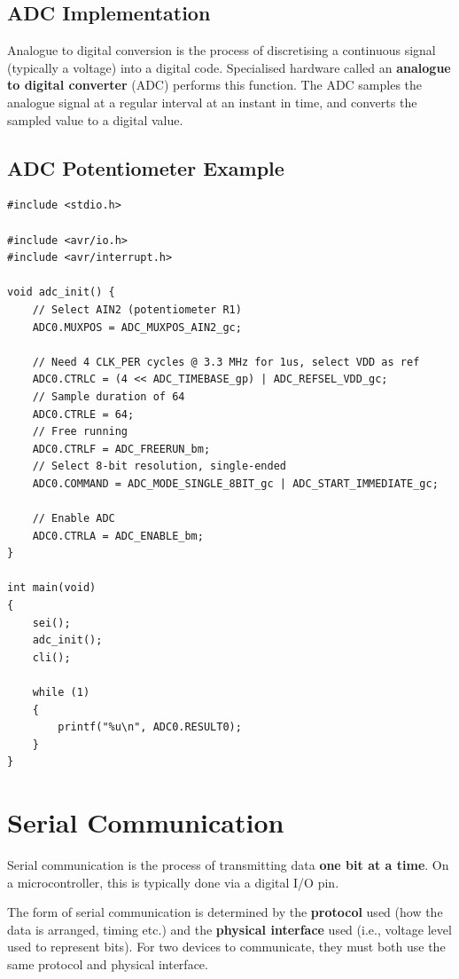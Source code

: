 \documentclass{report}
\begin{document}
\subsection{ADC Implementation}
Analogue to digital conversion is the process of discretising a continuous signal (typically a voltage)
into a digital code. Specialised hardware called an \textbf{analogue to digital converter} (ADC)
performs this function. The ADC samples the analogue signal at a regular interval at an instant in time, and
converts the sampled value to a digital value.
\subsection{ADC Potentiometer Example}
\begin{verbatim}
#include <stdio.h>

#include <avr/io.h>
#include <avr/interrupt.h>

void adc_init() {
    // Select AIN2 (potentiometer R1)
    ADC0.MUXPOS = ADC_MUXPOS_AIN2_gc;

    // Need 4 CLK_PER cycles @ 3.3 MHz for 1us, select VDD as ref
    ADC0.CTRLC = (4 << ADC_TIMEBASE_gp) | ADC_REFSEL_VDD_gc;
    // Sample duration of 64
    ADC0.CTRLE = 64;
    // Free running
    ADC0.CTRLF = ADC_FREERUN_bm;
    // Select 8-bit resolution, single-ended
    ADC0.COMMAND = ADC_MODE_SINGLE_8BIT_gc | ADC_START_IMMEDIATE_gc;

    // Enable ADC
    ADC0.CTRLA = ADC_ENABLE_bm;
}

int main(void)
{
    sei();
    adc_init();
    cli();

    while (1)
    {
        printf("%u\n", ADC0.RESULT0);
    }
}
\end{verbatim}
\section{Serial Communication}
Serial communication is the process of transmitting data \textbf{one bit at a time}.
On a microcontroller, this is typically done via a digital I/O pin.

The form of serial communication is determined by the \textbf{protocol} used (how the data is arranged, timing etc.)
and the \textbf{physical interface} used (i.e., voltage level used to represent bits).
For two devices to communicate, they must both use the same protocol and physical interface.
\end{document}
